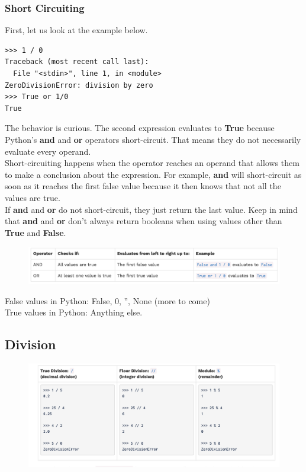 \documentclass[11pt]{article}
\begin{document}
\subsubsection{Short Circuiting}
First, let us look at the example below. 
\begin{lstlisting}
>>> 1 / 0
Traceback (most recent call last):
  File "<stdin>", line 1, in <module>
ZeroDivisionError: division by zero
>>> True or 1/0
True
\end{lstlisting}
The behavior is curious. The second expression evaluates to \textbf{True} because Python's \textbf{and} and \textbf{or} operators short-circuit. That means they do not necessarily evaluate every operand. \\
Short-circuiting happens when the operator reaches an operand that allows them to make a conclusion about the expression. For example, \textbf{and} will short-circuit as soon as it reaches the first false value because it then knows that not all the values are true. \\
If \textbf{and} and \textbf{or} do not short-circuit, they just return the last value. Keep in mind that \textbf{and} and \textbf{or} don't always return booleans when using values other than \textbf{True} and \textbf{False}.
\begin{figure}[h]
\includegraphics[scale=0.5]{boolean} 
\centering
\end{figure}
\newline
\newline
False values in Python: False, 0, '', None (more to come) \\
True values in Python: Anything else. 

\subsection{Division}
\begin{figure}[h]
\includegraphics[scale=0.6]{Division} 
\centering
\end{figure}
\end{document}
